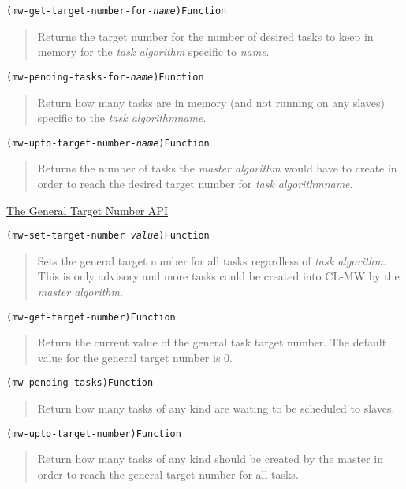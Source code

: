 \documentclass[titlepage,12pt]{book}
\newcommand{\xsmall}{\latexhtml{\small}{}}
\newcommand{\xnormalsize}{\latexhtml{\normalsize}{}}
\newcommand{\clmw}{\xsmall\textsc{CL-MW}\xnormalsize\xspace}
\newcommand{\ma}{\textit{master algorithm}\xspace}
\newcommand{\ta}{\textit{task algorithm}\xspace}
\newcommand{\apiheader}[1]{\begin{center}\underline{#1}\end{center}}
\newcommand{\apifunc}[2]{\noindent\xsmall\texttt{(#1)}\hspace*{\fill}\xnormalsize\texttt{#2}}
\newenvironment{apientry}[2]
	{\apifunc{#1}{#2}\begin{quotation}}
	{\end{quotation}}
\newcommand{\phlabel}[1]{\phantomsection\label{#1}}
\begin{document}
\begin{apientry}
{mw-get-target-number-for-\textit{name}}
{Function}
Returns the target number for the number of desired tasks to
keep in memory for the \ta specific to \emph{name}.
\end{apientry}

\begin{apientry}
{mw-pending-tasks-for-\textit{name}}
{Function}
Return how many tasks are in memory (and not running on any slaves) specific
to the \ta \emph{name}.
\end{apientry}

\begin{apientry}
{mw-upto-target-number-\textit{name}}
{Function}
Returns the number of tasks the \ma would have to create in order
to reach the desired target number for \ta \emph{name}.
\end{apientry}

\apiheader{\phlabel{general-target-number-api}The General Target Number API}
\begin{apientry}
{mw-set-target-number \emph{value}}
{Function}
Sets the general target number for all tasks regardless of \ta. This is
only advisory and more tasks could be created into \clmw by the \ma.
\end{apientry}

\begin{apientry}
{mw-get-target-number}
{Function}
Return the current value of the general task target number. The
default value for the general target number is 0.
\end{apientry}

\begin{apientry}
{mw-pending-tasks}
{Function}
Return how many tasks of any kind are waiting to be scheduled to slaves.
\end{apientry}

\begin{apientry}
{mw-upto-target-number}
{Function}
Return how many tasks of any kind should be created by the master in order
to reach the general target number for all tasks.
\end{apientry}
\end{document}
